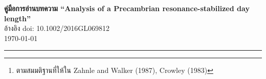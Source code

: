 \documentclass[a4paper, 12pt]{article}
\theoremstyle{plain} %
\begin{document}
\thispagestyle{plain}
\begin{center}
{\Large\textbf{คู่มือการอ่านบทความ ``Analysis of a Precambrian resonance-stabilized day length''}}\\
อ้างอิง doi: 10.1002/2016GL069812\\
\today
\end{center}
\begin{abstract}
	บทความนี้เป็นบทความที่พูดถึงความหน่วงของการหมุนรอบตัวเองของโลก (Earth's decelerating rotation) ซึ่งได้พูดว่าในช่วงยุค Precambrian ซึ่งเป็นช่วงที่โลกอยู่ในช่วงที่กำลังสร้างสิ่งมีชีวิต (ประมาณก่อน 500 ล้านปีก่อน) จะมีอุณหภูมิที่แปรผันอย่างมากตั้งแต่อุณหภูมิที่สูงและต่ำอย่างมาก ทำให้เป็นปัจจัยที่โลกหมุนรอบตัวเองหน่วงลงอย่างมีนัยสำคัญ ซึ่งแต่เดิมแล้วโลกหมุนรอบตัวเองด้วยอัตราคงที่ที่ประมาณ 21 ชั่วโมง แม้จะมี thermal noise เล็กน้อยแทรกอยู่ตลอดก็ตาม การค้นพบนี้มีการศึกษามาแล้วผ่านการวิเคราะห์ทางธรณีวิทยา เช่น ชั้นหิน, ความเป็นกรดเบส และอุณหภูมิคาดการณ์ที่ทำให้มีลักษณะชั้นหินแบบต่าง ๆ ขึ้นในแต่ละยุคสมัย\footnote{ตามสมมติฐานที่ให้ใน Zahnle and Walker (1987), Crowley (1983)} ความพิเศษของบทความนี้ คือ ผู้วิจัยได้พิจารณาโดยใช้วิธีจำลองออกมาจากสมการคลื่น ซึ่งพิจารณา atmospheric tidal force และ thermal perturbation ด้วยคอมพิวเตอร์ ซึ่งทำให้เห็นภาพแนวโน้มของการหมุนรอบตัวเองในอนาคตได้
\end{abstract}
\tableofcontents
\noindent\rule{\textwidth}{0.4pt}
\end{document}
